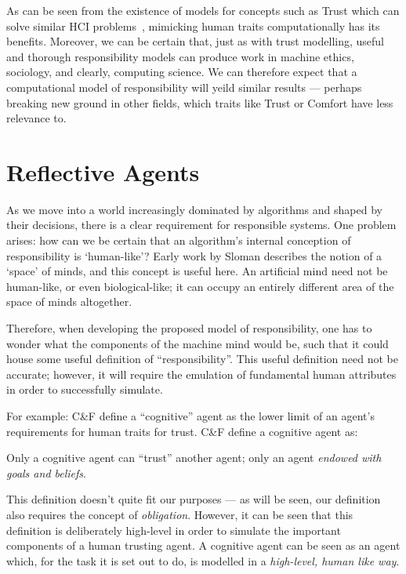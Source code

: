 As can be seen from the existence of models for concepts such as Trust which can solve similar HCI problems~\cite{designing_with_trust}, mimicking human traits computationally has its benefits. Moreover, we can be certain that, just as with trust modelling, useful and thorough responsibility models can produce work in machine ethics\cite{Moor2006}, sociology\cite{Macy2002}, and clearly, computing science. We can therefore expect that a computational model of responsibility will yeild similar results --- perhaps breaking new ground in other fields, which traits like Trust or Comfort have less relevance to.\par

\section{Reflective Agents}

As we move into a world increasingly dominated by algorithms and shaped by their decisions, there is a clear requirement for responsible systems. One problem arises: how can we be certain that an algorithm's internal conception of responsibility is `human-like'? Early work by Sloman describes the notion of a `space' of minds\cite{Sloman1984TheMinds}, and this concept is useful here. An artificial mind need not be human-like, or even biological-like; it can occupy an entirely different area of the space of minds altogether. \par

Therefore, when developing the proposed model of responsibility, one has to wonder what the components of the machine mind would be, such that it could house some useful definition of ``responsibility''. This useful definition need not be accurate; however, it will require the emulation of fundamental human attributes in order to successfully simulate.\par

For example: C\&F define a ``cognitive'' agent as the lower limit of an agent's requirements for human traits for trust. C\&F define a cognitive agent as:
\begin{displayquote}
    Only a cognitive agent can ``trust'' another agent; only an agent \emph{endowed with goals and beliefs}.
\end{displayquote}\par

This definition doesn't quite fit our purposes --- as will be seen, our definition also requires the concept of \emph{obligation}. However, it can be seen that this definition is deliberately high-level in order to simulate the important components of a human trusting agent. A cognitive agent can be seen as an agent which, for the task it is set out to do, is modelled in a \emph{high-level, human like way}. \par

